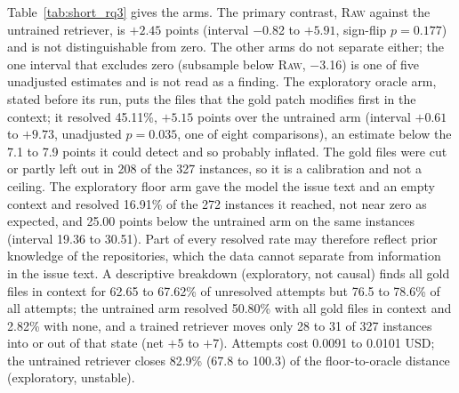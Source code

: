 \documentclass[10pt,twocolumn]{article}
\makeatletter
\renewcommand\section{\@startsection{section}{1}{\z@}{5pt}{2pt}{\normalfont\large\bfseries}}
\makeatother
\begin{document}


Table~\ref{tab:short_rq3} gives the arms. The primary contrast, \textsc{Raw} against the untrained retriever, is $+2.45$ points (interval $-$0.82 to $+5.91$, sign-flip $p=0.177$) and is not distinguishable from zero. %
The other arms do not separate either; the one interval that excludes zero (subsample below \textsc{Raw}, $-$3.16) is one of five unadjusted estimates and is not read as a finding. %
The exploratory oracle arm, stated before its run, puts the files that the gold patch modifies first in the context; it resolved 45.11\%, $+5.15$ points over the untrained arm (interval $+0.61$ to $+9.73$, unadjusted $p=0.035$, one of eight comparisons), an estimate below the 7.1 to 7.9 points it could detect and so probably inflated. %
The gold files were cut or partly left out in 208 of the 327 instances, so it is a calibration and not a ceiling. %
The exploratory floor arm gave the model the issue text and an empty context and resolved 16.91\% of the 272 instances it reached, not near zero as expected, and 25.00 points below the untrained arm on the same instances (interval 19.36 to 30.51). %
Part of every resolved rate may therefore reflect prior knowledge of the repositories, which the data cannot separate from information in the issue text. %
A descriptive breakdown (exploratory, not causal) finds all gold files in context for 62.65 to 67.62\% of unresolved attempts but 76.5 to 78.6\% of all attempts; the untrained arm resolved 50.80\% with all gold files in context and 2.82\% with none, and a trained retriever moves only 28 to 31 of 327 instances into or out of that state (net $+5$ to $+7$). %
Attempts cost 0.0091 to 0.0101 USD; the untrained retriever closes 82.9\% (67.8 to 100.3) of the floor-to-oracle distance (exploratory, unstable). %

\section{Limitations}
\end{document}
